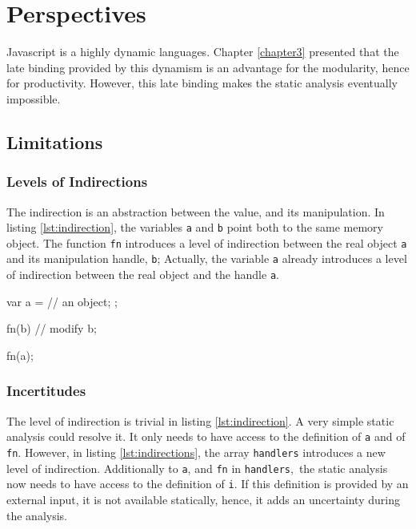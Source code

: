 \section{Perspectives}

Javascript is a highly dynamic languages.
Chapter \ref{chapter3} presented that the late binding provided by this dynamism is an advantage for the modularity, hence for productivity.
However, this late binding makes the static analysis eventually impossible.

\subsection{Limitations}

\subsubsection{Levels of Indirections}

The indirection is an abstraction between the value, and its manipulation.
In listing \ref{lst:indirection}, the variables \texttt{a} and \texttt{b} point both to the same memory object.
The function \texttt{fn} introduces a level of indirection between the real object \texttt{a} and its manipulation handle, \texttt{b};
Actually, the variable \texttt{a} already introduces a level of indirection between the real object and the handle \texttt{a}.

\begin{code}[js,
  caption={One level of Indirection},
  label={lst:indirection}]
var a = {
      // an object;
    };

fn(b) {
  // modify b;
}

fn(a);
\end{code}

\subsubsection{Incertitudes}

The level of indirection is trivial in listing \ref{lst:indirection}.
A very simple static analysis could resolve it.
It only needs to have access to the definition of \texttt{a} and of \texttt{fn}.
However, in listing \ref{lst:indirections}, the array \texttt{handlers} introduces a new level of indirection.
Additionally to \texttt{a}, and \texttt{fn} in \texttt{handlers}, the static analysis now needs to have access to the definition of \texttt{i}.
If this definition is provided by an external input, it is not available statically, hence, it adds an uncertainty during the analysis. 

